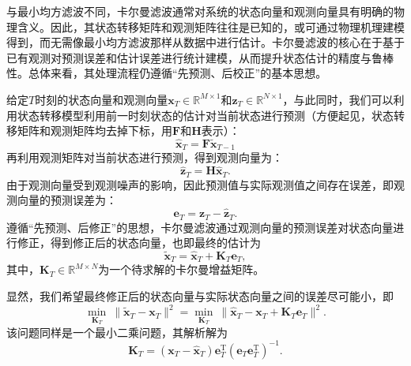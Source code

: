 与最小均方滤波不同，卡尔曼滤波通常对系统的状态向量和观测向量具有明确的物理含义。因此，其状态转移矩阵和观测矩阵往往是已知的，或可通过物理机理建模得到，而无需像最小均方滤波那样从数据中进行估计。卡尔曼滤波的核心在于基于已有观测对预测误差和估计误差进行统计建模，从而提升状态估计的精度与鲁棒性。总体来看，其处理流程仍遵循``先预测、后校正''的基本思想。

给定\( T \)时刻的状态向量和观测向量\( \bm{x}_T \in \mathbb{R}^{M \times 1} \)和\( \bm{z}_T \in \mathbb{R}^{N \times 1} \)，与此同时，我们可以利用状态转移模型利用前一时刻状态的估计对当前状态进行预测（方便起见，状态转移矩阵和观测矩阵均去掉下标，用\( \mathbf{F} \)和\( \mathbf{H} \)表示）：
\[
    \hat{\bm{x}}_{T} = \mathbf{F} \tilde{\bm{x}}_{T-1}
\]
再利用观测矩阵对当前状态进行预测，得到观测向量为：
\[
    \hat{\bm{z}}_{T} = \mathbf{H} \hat{\bm{x}}_{T}.
\]
由于观测向量受到观测噪声的影响，因此预测值与实际观测值之间存在误差，即观测向量的预测误差为：
\[
    \bm{e}_T = \bm{z}_T - \hat{\bm{z}}_T.
\]
遵循``先预测、后修正''的思想，卡尔曼滤波通过观测向量的预测误差对状态向量进行修正，得到修正后的状态向量，也即最终的估计为
\[
    \tilde{\bm{x}}_T = \hat{\bm{x}}_T + \mathbf{K}_T \bm{e}_T,
\]
其中，\( \mathbf{K}_T \in \mathbb{R}^{M \times N} \)为一个待求解的卡尔曼增益矩阵。

显然，我们希望最终修正后的状态向量与实际状态向量之间的误差尽可能小，即
\[
    \min_{\mathbf{K}_T} \ \big\|\tilde{\bm{x}}_T - \bm{x}_T \big\|^2 = \min_{\mathbf{K}_T} \ \big\| \hat{\bm{x}}_T - \bm{x}_T + \mathbf{K}_T \bm{e}_T \big\|^2.
\]
该问题同样是一个最小二乘问题，其解析解为
\[
    \mathbf{K}_T = \left( \bm{x}_T - \hat{\bm{x}}_T \right) \bm{e}_T^{\mathrm{T}} \left( \bm{e}_T \bm{e}_T^{\mathrm{T}} \right)^{-1}.
\]

